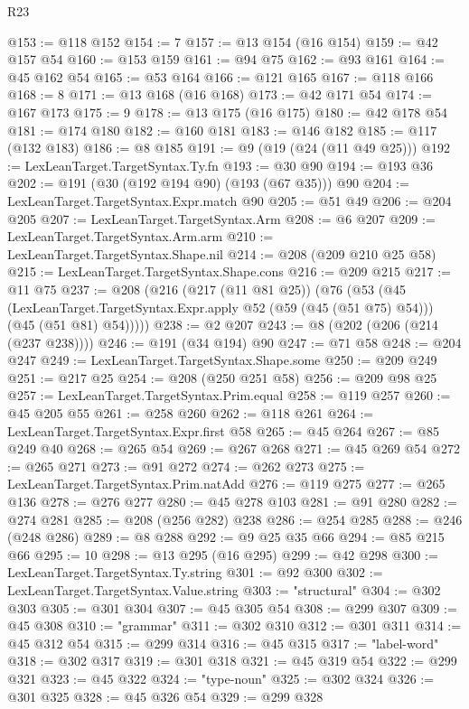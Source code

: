 \begin{lexlean}{R23}
\begin{coremodule}
@153 := @118 @152
@154 := 7
@157 := @13 @154 (@16 @154)
@159 := @42 @157 @54
@160 := @153 @159
@161 := @94 @75
@162 := @93 @161
@164 := @45 @162 @54
@165 := @53 @164
@166 := @121 @165
@167 := @118 @166
@168 := 8
@171 := @13 @168 (@16 @168)
@173 := @42 @171 @54
@174 := @167 @173
@175 := 9
@178 := @13 @175 (@16 @175)
@180 := @42 @178 @54
@181 := @174 @180
@182 := @160 @181
@183 := @146 @182
@185 := @117 (@132 @183)
@186 := @8 @185
@191 := @9 (@19 (@24 (@11 @49 @25)))
@192 := LexLeanTarget.TargetSyntax.Ty.fn
@193 := @30 @90
@194 := @193 @36
@202 := @191 (@30 (@192 @194 @90) (@193 (@67 @35))) @90
@204 := LexLeanTarget.TargetSyntax.Expr.match @90
@205 := @51 @49
@206 := @204 @205
@207 := LexLeanTarget.TargetSyntax.Arm
@208 := @6 @207
@209 := LexLeanTarget.TargetSyntax.Arm.arm
@210 := LexLeanTarget.TargetSyntax.Shape.nil
@214 := @208 (@209 @210 @25 @58)
@215 := LexLeanTarget.TargetSyntax.Shape.cons
@216 := @209 @215
@217 := @11 @75
@237 := @208
    (@216
      (@217 (@11 @81 @25))
      (@76
        (@53
          (@45
            (LexLeanTarget.TargetSyntax.Expr.apply @52 (@59 (@45 (@51 @75) @54)))
            (@45 (@51 @81) @54)))))
@238 := @2 @207
@243 := @8 (@202 (@206 (@214 (@237 @238))))
@246 := @191 (@34 @194) @90
@247 := @71 @58
@248 := @204 @247
@249 := LexLeanTarget.TargetSyntax.Shape.some
@250 := @209 @249
@251 := @217 @25
@254 := @208 (@250 @251 @58)
@256 := @209 @98 @25
@257 := LexLeanTarget.TargetSyntax.Prim.equal
@258 := @119 @257
@260 := @45 @205 @55
@261 := @258 @260
@262 := @118 @261
@264 := LexLeanTarget.TargetSyntax.Expr.first @58
@265 := @45 @264
@267 := @85 @249 @40
@268 := @265 @54
@269 := @267 @268
@271 := @45 @269 @54
@272 := @265 @271
@273 := @91 @272
@274 := @262 @273
@275 := LexLeanTarget.TargetSyntax.Prim.natAdd
@276 := @119 @275
@277 := @265 @136
@278 := @276 @277
@280 := @45 @278 @103
@281 := @91 @280
@282 := @274 @281
@285 := @208 (@256 @282) @238
@286 := @254 @285
@288 := @246 (@248 @286)
@289 := @8 @288
@292 := @9 @25 @35 @66
@294 := @85 @215 @66
@295 := 10
@298 := @13 @295 (@16 @295)
@299 := @42 @298
@300 := LexLeanTarget.TargetSyntax.Ty.string
@301 := @92 @300
@302 := LexLeanTarget.TargetSyntax.Value.string
@303 := "structural"
@304 := @302 @303
@305 := @301 @304
@307 := @45 @305 @54
@308 := @299 @307
@309 := @45 @308
@310 := "grammar"
@311 := @302 @310
@312 := @301 @311
@314 := @45 @312 @54
@315 := @299 @314
@316 := @45 @315
@317 := "label-word"
@318 := @302 @317
@319 := @301 @318
@321 := @45 @319 @54
@322 := @299 @321
@323 := @45 @322
@324 := "type-noun"
@325 := @302 @324
@326 := @301 @325
@328 := @45 @326 @54
@329 := @299 @328

\end{coremodule}
\end{lexlean}

